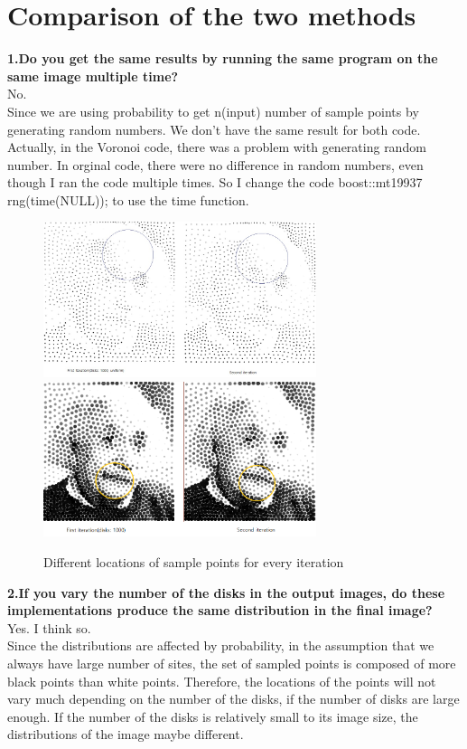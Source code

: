 \documentclass[11pt]{article}
\begin{document}
\section{Comparison of the two methods}

\textbf{1.Do you get the same results by running the same program on the same image multiple time?}\\
No. \\
Since we are using probability to get n(input) number of sample points by generating random numbers. We don't have the same result for both code. Actually, in the Voronoi code, there was a problem with generating random number. In orginal code, there were no difference in random numbers, even though I ran the code multiple times. So I change the code boost::mt19937 rng(time(NULL)); to use the time function.\\

\smallskip
\begin{figure}[hc]
  \includegraphics[width=80mm]{compare1.jpg}
  \includegraphics[width=80mm]{compare1(vor).jpg}
  \caption{Different locations of sample points for every iteration}  \label{compare1h}
\end{figure}


\textbf{2.If you vary the number of the disks in the output images, do these implementations produce the same distribution in the final image?}\\
Yes. I think so.\\
Since the distributions are affected by probability, in the assumption that we always have large number of sites, the set of sampled points is composed of more black points than white points. Therefore, the locations of the points will not vary much depending on the number of the disks, if the number of disks are large enough. If the number of the disks is relatively small to its image size, the distributions of the image maybe different.\\
\end{document}
